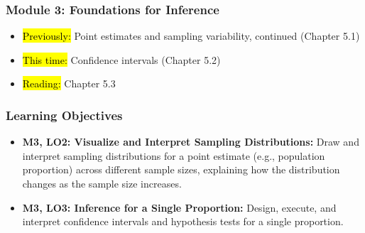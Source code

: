 
\begin{frame}
    \frametitle{Module 3: Foundations for Inference}
    \begin{itemize}
        \item \hl{Previously: }Point estimates and sampling variability, continued (Chapter 5.1)
        \item \hl{This time: }Confidence intervals (Chapter 5.2)
        \item \hl{Reading: }Chapter 5.3
    \end{itemize}

\end{frame}
\begin{frame}
    \frametitle{Learning Objectives}
    \begin{itemize}
        \item \textbf{M3, LO2: Visualize and Interpret Sampling Distributions:} Draw and interpret sampling distributions for a point estimate (e.g., population proportion) across different sample sizes, explaining how the distribution changes as the sample size increases.
        \item \textbf{M3, LO3: Inference for a Single Proportion:} Design, execute, and interpret confidence intervals and hypothesis tests for a single proportion.
    \end{itemize}
\end{frame}

